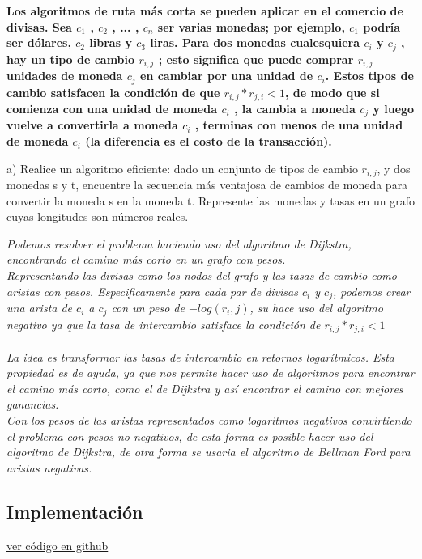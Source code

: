 \documentclass{article}
\begin{document}
\begin{question}
  \textbf{Los algoritmos de ruta más corta se pueden aplicar en el comercio de divisas. Sea $c_{1}$ , $c_{2}$ , ... , $c_{n}$ ser varias monedas; por ejemplo, $c_{1}$ podría ser dólares, $c_{2}$ libras y $c_{3}$ liras. Para dos monedas cualesquiera $c_{i}$ y $c_{j}$ , hay un tipo de cambio $r_{i,j}$ ; esto significa que puede comprar $r_{i,j}$ unidades de moneda $c_{j}$ en cambiar por una unidad de $c_{i}$. Estos tipos de cambio satisfacen la condición de que $r_{i,j} * r_{j,i} < 1$, de modo que si comienza con una unidad de moneda $c_{i}$ , la cambia a moneda $c_{j}$ y luego vuelve a convertirla a moneda $c_{i}$ , terminas con menos de una unidad de moneda $c_{i}$ (la diferencia es el costo de la transacción).}

  a) Realice un algoritmo eficiente: dado un conjunto de tipos de cambio $r_{i,j}$, y dos monedas s y t, encuentre la secuencia más ventajosa de cambios de moneda para convertir la moneda s en la moneda t. Represente las monedas y tasas en un grafo cuyas longitudes son números reales.
  
\end{question}

\textit{Podemos resolver el problema haciendo uso del algoritmo de Dijkstra, encontrando el camino más corto en un grafo con pesos.\\ Representando las divisas como los nodos del grafo y las tasas de cambio como aristas con pesos. Especificamente para cada par de divisas $c_{i}$ y $c_{j}$, podemos crear una arista de $c_{i}$ a $c_{j}$ con un peso de $-log(r_{i},j)$, su hace uso del algoritmo negativo ya que la tasa de intercambio satisface la condición de $r_{i,j}*r_{j,i} < 1$\\\\ La idea es transformar las tasas de intercambio en retornos logarítmicos. Esta propiedad es de ayuda, ya que nos permite hacer uso de algoritmos para encontrar el camino más corto, como el de Dijkstra y así encontrar el camino con mejores ganancias. \\ Con los pesos de las aristas representados como logaritmos negativos convirtiendo el problema con pesos no negativos, de esta forma es posible hacer uso del algoritmo de Dijkstra, de otra forma se usaria el algoritmo de Bellman Ford para aristas negativas.}

\subsection{Implementación}
\href{https://github.com/luisballado/ADA/blob/main/practice_code/tarea4_contenedores.cpp}{ver código en github}\\
\end{document}
